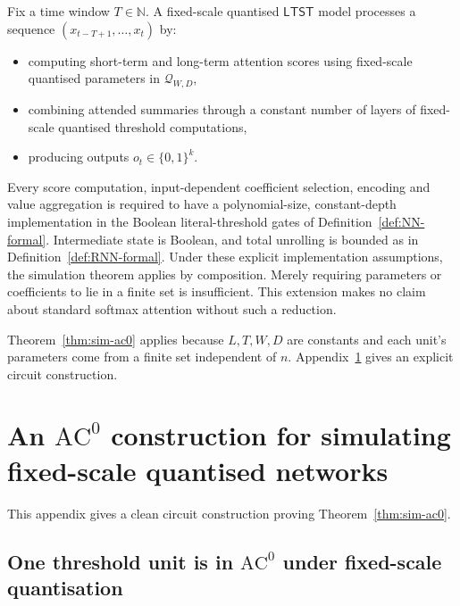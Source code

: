 \documentclass[twoside,11pt]{article}
\newcommand{\AC}{\mathrm{AC}}
\newcommand{\LTST}{\mathsf{LTST}}
\newcommand{\bits}{\{0,1\}}
\newcommand{\N}{\mathbb{N}}
\newcommand{\Qset}{\mathcal{Q}}
\numberwithin{theorem}{section}
\numberwithin{equation}{section}
\begin{document}
\begin{definition}
\label{def:LTST-formal}
Fix a time window $T\in\N$.
A fixed-scale quantised $\LTST$ model processes a sequence $(x_{t-T+1},\dots,x_t)$ by:
\begin{itemize}[leftmargin=*]
\item computing short-term and long-term attention scores using fixed-scale quantised parameters in $\Qset_{W,D}$,
\item combining attended summaries through a constant number of layers of fixed-scale quantised threshold computations,
\item producing outputs $o_t\in\bits^k$.
\end{itemize}
Every score computation, input-dependent coefficient selection, encoding and value aggregation is required to have a polynomial-size, constant-depth implementation in the Boolean literal-threshold gates of Definition~\ref{def:NN-formal}. Intermediate state is Boolean, and total unrolling is bounded as in Definition~\ref{def:RNN-formal}. Under these explicit implementation assumptions, the simulation theorem applies by composition. Merely requiring parameters or coefficients to lie in a finite set is insufficient. This extension makes no claim about standard softmax attention without such a reduction.
\end{definition}

\begin{remark}
Theorem~\ref{thm:sim-ac0} applies because $L,T,W,D$ are constants and each unit’s parameters come from a finite set independent of $n$.
Appendix~\ref{app:ac0proof} gives an explicit circuit construction.
\end{remark}

\section{An \texorpdfstring{$\AC^0$}{AC0} construction for simulating fixed-scale quantised networks}
\label{app:ac0proof}

This appendix gives a clean circuit construction proving Theorem~\ref{thm:sim-ac0}.

\subsection{One threshold unit is in \texorpdfstring{$\AC^0$}{AC0} under fixed-scale quantisation}
\label{app:oneunit}
\end{document}
